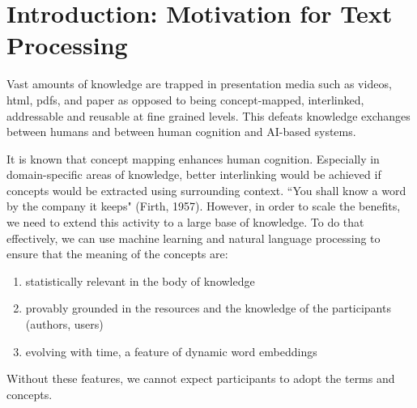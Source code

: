 \section{Introduction: Motivation for Text Processing} \label{sec:Introduction} 

Vast amounts of knowledge are trapped in presentation media such as videos, html, pdfs, and paper as opposed to being concept-mapped, interlinked, addressable and reusable at fine grained levels. This defeats knowledge exchanges between humans and between human cognition and AI-based systems.

It is known that concept mapping enhances human cognition. Especially in domain-specific areas of knowledge, better interlinking would be achieved if concepts would be extracted using surrounding context. ``You shall know a word by the company it keeps" (Firth, 1957). However, in order to scale the benefits, we need to extend this activity to a large base of knowledge. To do that effectively, we can use  machine learning and natural language processing to ensure that the meaning of the concepts are:
\begin{enumerate}
    \item statistically relevant in the body of knowledge
    
    \item provably grounded in the resources and the knowledge of the participants (authors, users)
    
    \item evolving with time, a feature of dynamic word embeddings
    
\end{enumerate}

Without these features, we cannot expect participants to adopt the terms and concepts.

